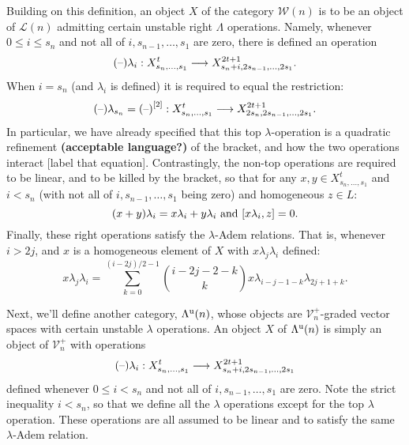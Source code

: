 \documentclass[11pt]{amsart}
\theoremstyle{plain}
\theoremstyle{definition}
\newcommand{\DASH}{\textup{--}}
\renewcommand{\to}{\longrightarrow}
\newcommand{\calW}{\mathcal{W}}
\newcommand{\calL}{\mathcal{L}}
\newcommand{\calV}{\mathcal{V}}
\theoremstyle{plain}
\newcommand{\LambdaMonad}{\Lambda^\textup{u}}
\newcommand{\restn}[1]{{#1}^{[2]}}
\newcommand{\vect}[2]{\calV^{#1}_{#2}}
\begin{document}
\begin{Unstable Lie algebras over the Lambda-algebra}
Building on this definition, an object $X$ of the category $\calW(n)$ is to be an object of $\calL(n)$ admitting certain unstable right $\Lambda$ operations. Namely, whenever $0\leq i\leq s_n$ and not all of $i,s_{n-1},\ldots,s_{1}$ are zero, there is defined an operation
\[(\DASH)\lambda_i:X^t_{s_n,\ldots,s_1}\to X^{2t+1}_{s_n+i,2s_{n-1},\ldots,2s_1}.\]
When $i=s_n$ (and $\lambda_i$ is defined) it is required to equal the restriction:
\[(\DASH)\lambda_{s_n}=\restn{(\DASH)}:X^t_{s_n,\ldots,s_1}\to X^{2t+1}_{2s_n,2s_{n-1},\ldots,2s_1}.\]
In particular, we have already specified that this top $\lambda$-operation is a quadratic refinement \textbf{(acceptable language?)} of the bracket, and how the two operations interact [label that equation]. Contrastingly, the non-top operations are required to be linear, and to be killed by the bracket, so that for any $x,y\in X^t_{s_n,\ldots,s_1}$ and $i<s_n$ (with not all of $i,s_{n-1},\ldots,s_{1}$ being zero) and homogeneous $z\in L$:
\[(x+y)\lambda_i=x\lambda_i+y\lambda_i\textup{ and }[x\lambda_i,z]=0.\]
Finally, these right operations satisfy the $\lambda$-Adem relations. That is, whenever $i>2j$, and $x$ is a homogeneous element of $X$ with $x\lambda_j\lambda_i$ defined:
\[x\lambda_j\lambda_i=\sum_{k=0}^{(i-2j)/2-1}{i-2j-2-k\choose k}x\lambda_{i-j-1-k}\lambda_{2j+1+k}.\]

Next, we'll define another category, $\LambdaMonad(n)$, whose objects are $\vect{+}{n}$-graded vector spaces with certain unstable $\lambda$ operations. An object $X$ of $\LambdaMonad(n)$ is simply an object of $\vect{+}{n}$ with operations
\[(\DASH)\lambda_i:X^t_{s_n,\ldots,s_1}\to X^{2t+1}_{s_n+i,2s_{n-1},\ldots,2s_1}\]
defined whenever $0\leq i< s_n$ and not all of $i,s_{n-1},\ldots,s_{1}$ are zero. Note the strict inequality $i<s_n$, so that we define all the $\lambda$ operations except for the top $\lambda$ operation. These operations are all assumed to be linear and to satisfy the same $\lambda$-Adem relation.


\end{Unstable Lie algebras over the Lambda-algebra}
\end{document}
